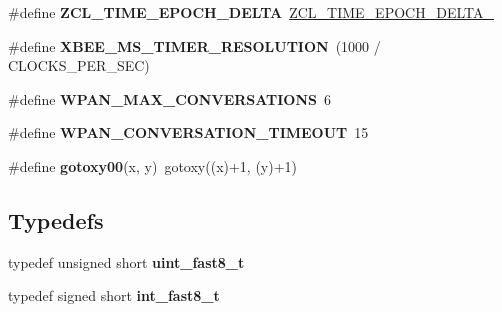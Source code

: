 \begin{DoxyCompactItemize}
\#define {\bfseries Z\+C\+L\+\_\+\+T\+I\+M\+E\+\_\+\+E\+P\+O\+C\+H\+\_\+\+D\+E\+L\+TA}~\hyperlink{group__hal_ga735b0974380a73e9d7a12a1f199a5921}{Z\+C\+L\+\_\+\+T\+I\+M\+E\+\_\+\+E\+P\+O\+C\+H\+\_\+\+D\+E\+L\+T\+A\+\_}
\item 
\mbox{\label{group__hal__dos_ga5cbeea4d9344138b657f78ad38813584}} 
\#define {\bfseries X\+B\+E\+E\+\_\+\+M\+S\+\_\+\+T\+I\+M\+E\+R\+\_\+\+R\+E\+S\+O\+L\+U\+T\+I\+ON}~(1000 / C\+L\+O\+C\+K\+S\+\_\+\+P\+E\+R\+\_\+\+S\+EC)
\item 
\mbox{\label{group__hal__dos_gae34b1efc8ba99add17fcd767852197d4}} 
\#define {\bfseries W\+P\+A\+N\+\_\+\+M\+A\+X\+\_\+\+C\+O\+N\+V\+E\+R\+S\+A\+T\+I\+O\+NS}~6
\item 
\mbox{\label{group__hal__dos_gaaa330f432d7a6bccdb393a656ddfe4d3}} 
\#define {\bfseries W\+P\+A\+N\+\_\+\+C\+O\+N\+V\+E\+R\+S\+A\+T\+I\+O\+N\+\_\+\+T\+I\+M\+E\+O\+UT}~15
\item 
\mbox{\label{group__hal__dos_ga47eb4ad5b4e00af034717327c7fa909d}} 
\#define {\bfseries gotoxy00}(x,  y)~gotoxy((x)+1, (y)+1)
\end{DoxyCompactItemize}
\subsection*{Typedefs}
\begin{DoxyCompactItemize}
\item 
\mbox{\label{group__hal__dos_gacce279dbc21c640ea1412e405c569887}} 
typedef unsigned short {\bfseries uint\+\_\+fast8\+\_\+t}
\item 
\mbox{\label{group__hal__dos_gaa301edfd56a74118dc796a2f1aa67f20}} 
typedef signed short {\bfseries int\+\_\+fast8\+\_\+t}
\end{DoxyCompactItemize}
